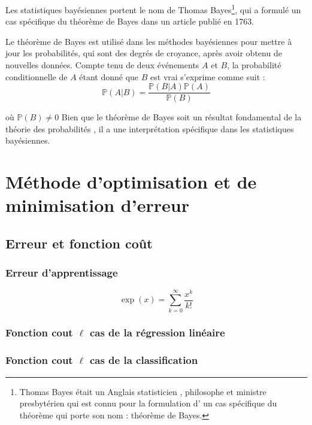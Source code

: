 	Les statistiques bayésiennes portent le nom de Thomas Bayes\footnote{Thomas Bayes était un Anglais statisticien , philosophe et ministre presbytérien qui est connu pour la formulation d' un cas spécifique du théorème qui porte son nom : théorème de Bayes.}, qui a formulé un cas spécifique du théorème de Bayes dans un article publié en 1763.
	
	
	
	\begin{thm} Le théorème de Bayes est utilisé dans les méthodes bayésiennes pour mettre à jour les probabilités, qui sont des degrés de croyance, après avoir obtenu de nouvelles données. Compte tenu de deux événements $A$  et $B$, la probabilité conditionnelle de $A$ étant donné que $B$ est vrai s'exprime comme suit  :
	\begin{equation}
	\mathbb{P}(A|B) = \frac{\mathbb{P}(B|A) \mathbb{P}(A)}{\mathbb{P}(B)}
	\end{equation}
	
	\end{thm}
	
	où $\mathbb{P}(B) \ne 0$ Bien que le théorème de Bayes soit un résultat fondamental de la théorie des probabilités , il a une interprétation spécifique dans les statistiques bayésiennes.



\section{Méthode d'optimisation et de minimisation d'erreur}
	\subsection{Erreur et fonction coût}
	\lipsum[1]
	\subsubsection{Erreur d'apprentissage}
	\lipsum[1]
	
	\[\exp(x)=\sum_{k=0}^{\infty}\frac{x^k}{k!}\]
	\lipsum[4]
	\subsubsection{Fonction cout $\ell$ cas de la régression linéaire}
	\lipsum[1]
	\subsubsection{Fonction cout $\ell$ cas  de la classification}
	\lipsum[1]
	
